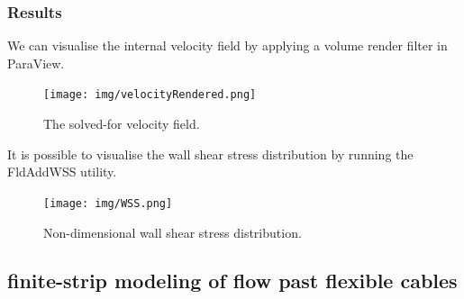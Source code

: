 \subsubsection{Results}
We can visualise the internal velocity field by applying a volume render filter in ParaView.

\begin{figure}
\begin{center}
\texttt{[image: img/velocityRendered.png]}
\caption{The solved-for velocity field.}
\end{center}
\end{figure}

It is possible to visualise the wall shear stress distribution by running the FldAddWSS utility.

\begin{figure}
\begin{center}
\texttt{[image: img/WSS.png]}
\caption{Non-dimensional wall shear stress distribution.}
\end{center}
\end{figure}

\subsection{finite-strip modeling of flow past flexible cables}

